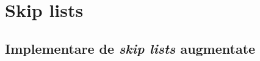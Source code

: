 \documentclass[../main.tex]{subfiles}
\begin{document}
\chapter{Skip lists}

\section{Implementare de \textit{skip lists} augmentate}
\label{code:skip-lists}

\inputminted{cpp}{../src/advanced-ds/skip-lists.cpp}
\end{document}
